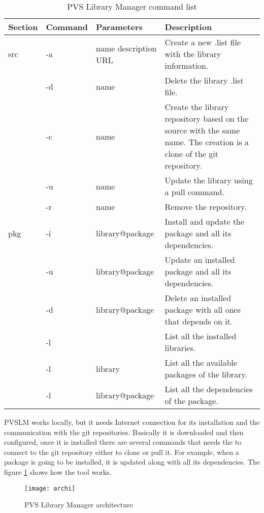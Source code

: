\begin{table}[h!]
  \begin{center}
    \begin{tabular}{ | l | l | l | p{5cm} | }
      \hline Section & Command & Parameters & Description \\ \hline
      src & -a          & name description URL  & Create a new .list file with the library information.                   \\ \cline{2-4}
          & -d          & name                  & Delete the library .list file.                                          \\ \cline{2-4}
          & -c          & name                  & Create the library repository based on the source with the same name. 
                                                  The creation is a clone of the git repository.                          \\ \cline{2-4}
          & -u          & name                  & Update the library using a pull command.                                \\ \cline{2-4}
          & -r          & name                  & Remove the repository.                                                  \\ \hline
      pkg & -i          & library@package       & Install and update the package and all its dependencies.                \\ \cline{2-4}
          & -u          & library@package       & Update an installed package and all its dependencies.                   \\ \cline{2-4}
          & -d          & library@package       & Delete an installed package with all ones that depends on it.           \\ \cline{2-4}
          & -l          &                       & List all the installed libraries.                                       \\ \cline{2-4}
          & -l          & library               & List all the available packages of the library.                         \\ \cline{2-4}
          & -l          & library@package       & List all the dependencies of the package.                               \\ \hline
    \end{tabular}
  \end{center}
  \caption{PVS Library Manager command list}
  \label{tab:comm}
\end{table}

PVSLM works locally, but it needs Internet connection for its installation and the communication with the git repositories. Basically it is downloaded and then configured, once it is installed there are several commands that needs the to connect to the git repository either to clone or pull it. For example, when a package is going to be installed, it is updated along with all its dependencies. The figure \ref{fig:archi} shows how the tool works.

\begin{figure}[h!]
  \centering
  \texttt{[image: archi]}
  \caption{PVS Library Manager architecture}
  \label{fig:archi}
\end{figure}

